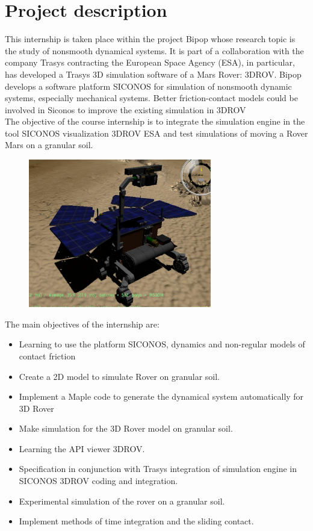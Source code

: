 \chapter{Project description}
\ifpdf
    \graphicspath{{Chapter2/PNG/}{Chapter2/PDF/}{Chapter2/}}
\else
    \graphicspath{{Chapter2/Chapter2Figs/EPS/}{Chapter2/}}
\fi

This internship is taken place within the project Bipop whose research topic is the study of
nonsmooth dynamical systems. It is part of a collaboration with the company
Trasys contracting the European Space Agency (ESA), in particular, has developed a Trasys
3D simulation software of a Mars Rover: 3DROV. Bipop develops a software platform SICONOS for
simulation of nonsmooth dynamic systems, especially mechanical systems. Better friction-contact models could be involved in Siconos to improve the existing simulation in 3DROV\\

The objective of the course internship is to integrate the simulation engine in the tool SICONOS
visualization 3DROV ESA and test simulations of moving a Rover Mars on a granular soil.

\begin{figure}[H]
 \begin{center}
      \includegraphics[width=8cm]{stage.EPS}
  \end{center}
\end{figure}


The main objectives of the internship are:

\begin{itemize}
\item Learning to use the platform SICONOS, dynamics and non-regular
models of contact friction
\item Create a 2D model to simulate Rover on granular soil.
\item Implement a Maple code to generate the dynamical system automatically for 3D Rover
\item Make simulation for the 3D Rover model on granular soil.
\item Learning the API viewer 3DROV.
\item Specification in conjunction with Trasys integration of simulation engine in SICONOS
3DROV coding and integration.
\item Experimental simulation of the rover on a granular soil.
\item Implement methods of time integration and the sliding contact.
\end{itemize}

